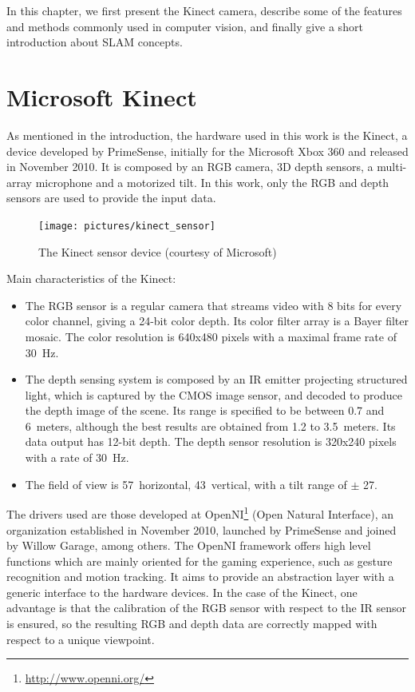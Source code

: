 In this chapter, we first present the Kinect camera, describe some of the features and methods commonly used in computer vision, and finally give a short introduction about SLAM concepts.

\section{Microsoft Kinect}

As mentioned in the introduction, the hardware used in this work is the Kinect, a device developed by PrimeSense, initially for the Microsoft Xbox 360 and released in November 2010. It is composed by an RGB camera, 3D depth sensors, a multi-array microphone and a motorized tilt. In this work, only the RGB and depth sensors are used to provide the input data.

\begin{figure}[H]
\centering
\texttt{[image: pictures/kinect\_sensor]}
\caption{The Kinect sensor device (courtesy of Microsoft)}
\end{figure}

Main characteristics of the Kinect:
\begin{itemize}
 \item The RGB sensor is a regular camera that streams video with 8 bits for every color channel, giving a 24-bit color depth. Its  color filter array is a Bayer filter mosaic. The color resolution is 640x480 pixels with a maximal frame rate of 30~Hz.
 \item The depth sensing system is composed by an IR emitter projecting structured light, which is captured by the CMOS image sensor, and decoded to produce the depth image of the scene. Its range is specified to be between 0.7 and 6~meters, although the best results are obtained from 1.2 to 3.5~meters. Its data output has 12-bit depth. The depth sensor resolution is 320x240 pixels with a rate of 30~Hz.
 \item The field of view is 57\textdegree ~horizontal, 43\textdegree ~vertical, with a tilt range of $\pm$ 27\textdegree.
\end{itemize}

The drivers used are those developed at OpenNI\footnote{\url{http://www.openni.org/}} (Open Natural Interface), an organization established in November 2010, launched by PrimeSense and joined by Willow Garage, among others. The OpenNI framework offers high level functions which are mainly oriented for the gaming experience, such as gesture recognition and motion tracking. It aims to provide an abstraction layer with a generic interface to the hardware devices. In the case of the Kinect, one advantage is that the calibration of the RGB sensor with respect to the IR sensor is ensured, so the resulting RGB and depth data are correctly mapped with respect to a unique viewpoint.


